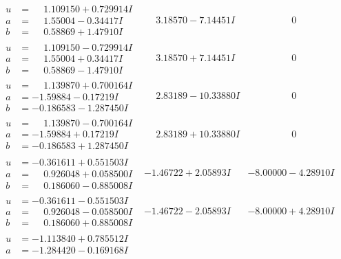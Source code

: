 \documentclass[1p]{elsarticle_modified}
\theoremstyle{definition}
\begin{document}
$$\begin{array}{c|c|c}
 \hline 
\begin{aligned}
u &= \phantom{-}1.109150 + 0.729914 I \\
a &= \phantom{-}1.55004 - 0.34417 I \\
b &= \phantom{-}0.58869 + 1.47910 I\end{aligned}
 & \phantom{-}3.18570 - 7.14451 I & \phantom{-0.000000 } 0 \\ \hline\begin{aligned}
u &= \phantom{-}1.109150 - 0.729914 I \\
a &= \phantom{-}1.55004 + 0.34417 I \\
b &= \phantom{-}0.58869 - 1.47910 I\end{aligned}
 & \phantom{-}3.18570 + 7.14451 I & \phantom{-0.000000 } 0 \\ \hline\begin{aligned}
u &= \phantom{-}1.139870 + 0.700164 I \\
a &= -1.59884 - 0.17219 I \\
b &= -0.186583 - 1.287450 I\end{aligned}
 & \phantom{-}2.83189 - 10.33880 I & \phantom{-0.000000 } 0 \\ \hline\begin{aligned}
u &= \phantom{-}1.139870 - 0.700164 I \\
a &= -1.59884 + 0.17219 I \\
b &= -0.186583 + 1.287450 I\end{aligned}
 & \phantom{-}2.83189 + 10.33880 I & \phantom{-0.000000 } 0 \\ \hline\begin{aligned}
u &= -0.361611 + 0.551503 I \\
a &= \phantom{-}0.926048 + 0.058500 I \\
b &= \phantom{-}0.186060 - 0.885008 I\end{aligned}
 & -1.46722 + 2.05893 I & -8.00000 - 4.28910 I \\ \hline\begin{aligned}
u &= -0.361611 - 0.551503 I \\
a &= \phantom{-}0.926048 - 0.058500 I \\
b &= \phantom{-}0.186060 + 0.885008 I\end{aligned}
 & -1.46722 - 2.05893 I & -8.00000 + 4.28910 I \\ \hline\begin{aligned}
u &= -1.113840 + 0.785512 I \\
a &= -1.284420 - 0.169168 I \\

\end{aligned}
\end{array}$$
\end{document}
